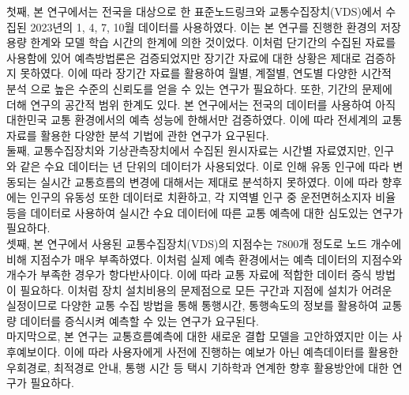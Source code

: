 \documentclass[11pt]{report}
\begin{document}
\indent 첫째, 본 연구에서는 전국을 대상으로 한 표준노드링크와 교통수집장치(VDS)에서 수집된 2023년의 1, 4, 7, 10월 데이터를 사용하였다. 
이는 본 연구를 진행한 환경의 저장용량 한계와 모델 학습 시간의 한계에 의한 것이었다. 
이처럼 단기간의 수집된 자료를 사용함에 있어 예측방법론은 검증되었지만 장기간 자료에 대한 상황은 제대로 검증하지 못하였다. 
이에 따라 장기간 자료를 활용하여 월별, 계절별, 연도별 다양한 시간적 분석 으로 높은 수준의 신뢰도를 얻을 수 있는 연구가 필요하다. 
또한, 기간의 문제에 더해 연구의 공간적 범위 한계도 있다. 
본 연구에서는 전국의 데이터를 사용하여 아직 대한민국 교통 환경에서의 예측 성능에 한해서만 검증하였다. 
이에 따라 전세계의 교통 자료를 활용한 다양한 분석 기법에 관한 연구가 요구된다. \\

\indent 둘째, 교통수집장치와 기상관측장치에서 수집된 원시자료는 시간별 자료였지만, 인구와 같은 수요 데이터는 년 단위의 데이터가 사용되었다. 
이로 인해 유동 인구에 따라 변동되는 실시간 교통흐름의 변경에 대해서는 제대로 분석하지 못하였다. 
이에 따라 향후에는 인구의 유동성 또한 데이터로 치환하고, 각 지역별 인구 중 운전면허소지자 비율 등을 데이터로 사용하여 
실시간 수요 데이터에 따른 교통 예측에 대한 심도있는 연구가 필요하다. \\

\indent 셋째, 본 연구에서 사용된 교통수집장치(VDS)의 지점수는 7800개 정도로 노드 개수에 비해 지점수가 매우 부족하였다. 
이처럼 실제 예측 환경에서는 예측 데이터의 지점수와 개수가 부족한 경우가 항다반사이다. 
이에 따라 교통 자료에 적합한 데이터 증식 방법이 필요하다. 
이처럼 장치 설치비용의 문제점으로 모든 구간과 지점에 설치가 어려운 실정이므로 다양한 교통 수집 방법을 통해 통행시간, 통행속도의 정보를 활용하여 교통량 데이터를 증식시켜 예측할 수 있는 연구가 요구된다. \\

\indent 
마지막으로, 본 연구는 교통흐름예측에 대한 새로운 결합 모델을 고안하였지만 이는 사후예보이다. 
이에 따라 사용자에게 사전에 진행하는 예보가 아닌 예측데이터를 활용한 우회경로, 최적경로 안내, 통행 시간 등 택시 기하학과 연계한 향후 활용방안에 대한 연구가 필요하다. 


\end{document}
